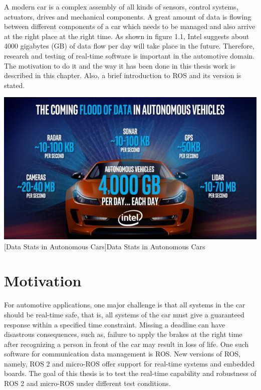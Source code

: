 \documentclass[%
xelatex,
	oneside,		%
	12pt,			%
	parskip=half,	%
	abstracton,
	chapterprefix=true%
    appendixprefix=true]
{scrbook}
\begin{document}
A modern car is a complex assembly of all kinds of sensors, control systems, actuators, drives and mechanical components. A great amount of data is flowing between different components of a car which needs to be managed and also arrive at the right place at the right time. As shown in figure 1.1, Intel suggests about 4000 gigabytes (GB) of data flow per day will take place in the future. Therefore, research and testing of real-time software is important in the automotive domain. The motivation to do it and the way it has been done in this thesis work is described in this chapter. Also, a brief introduction to ROS and its version is stated. 
\begin{center}
\includegraphics[scale=.5]{fig/autonomous-vehicle-data-intel-100697604-large.jpg}
[Data Stats in Autonomous Cars]{Data Stats in Autonomous Cars \cite{datastats}}
\label{fig:datastats}
\end{center}

     \section{Motivation}	
For automotive applications, one major challenge is that all systems in the car should be real-time safe, that is, all systems of the car must give a guaranteed response within a specified time constraint. Missing a deadline can have disastrous consequences, such as, failure to apply the brakes at the right time after recognizing a person in front of the car may result in loss of life. 
One such software for communication data management is ROS. New versions of ROS, namely, ROS 2 and micro-ROS offer support for real-time systems and embedded boards. The goal of this thesis is to test the real-time capability and robustness of ROS 2 and micro-ROS under different test conditions.
\end{document}
